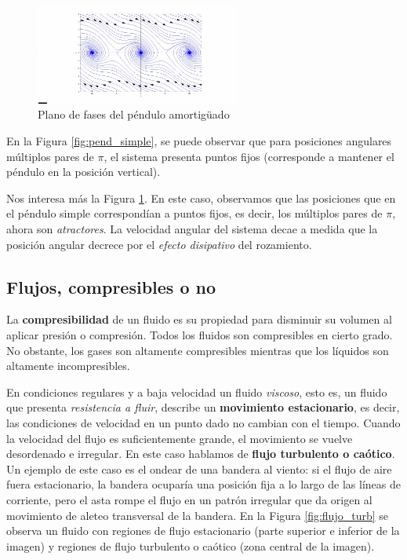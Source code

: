 \begin{figure}[hbtp]
\centering
\includegraphics[width = 0.6\textwidth]{img/pend_amort.jpg}
\caption{Plano de fases del péndulo amortigüado}
\label{fig:pend_amort}
\end{figure}

En la Figura \ref{fig:pend_simple}, se puede observar que para posiciones angulares múltiplos pares de $\pi$, el sistema presenta puntos fijos (corresponde a mantener el péndulo en la posición vertical).

Nos interesa más la Figura \ref{fig:pend_amort}. En este caso, observamos que las posiciones que en el péndulo simple correspondían a puntos fijos, es decir, los múltiplos pares de $\pi$, ahora son \emph{atractores}. La velocidad angular del sistema decae a medida que la posición angular decrece por el \emph{efecto disipativo} del rozamiento.
\subsection{Flujos, compresibles o no}
La \textbf{compresibilidad} de un fluido es su propiedad para disminuir su volumen al aplicar presión o compresión. Todos los fluidos son compresibles en cierto grado. No obstante, los gases son altamente compresibles mientras que los líquidos son altamente incompresibles.

En condiciones regulares y a baja velocidad un fluido \emph{viscoso}, esto es, un fluido que presenta \emph{resistencia a fluir}, describe un \textbf{ movimiento estacionario}, es decir, las condiciones de velocidad en un punto dado no cambian con el tiempo. Cuando la velocidad del flujo es suficientemente grande, el movimiento se vuelve desordenado e irregular. En este caso hablamos de \textbf{flujo turbulento o caótico}. Un ejemplo de este caso es el ondear de una bandera al viento: si el flujo de aire fuera estacionario, la bandera ocuparía una posición fija a lo largo de las líneas de corriente, pero el asta rompe el flujo en un patrón irregular que da origen al movimiento de aleteo transversal de la bandera. En la Figura \ref{fig:flujo_turb} se observa un fluido con regiones de flujo estacionario (parte superior e inferior de la imagen) y regiones de flujo turbulento o caótico (zona central de la imagen).

